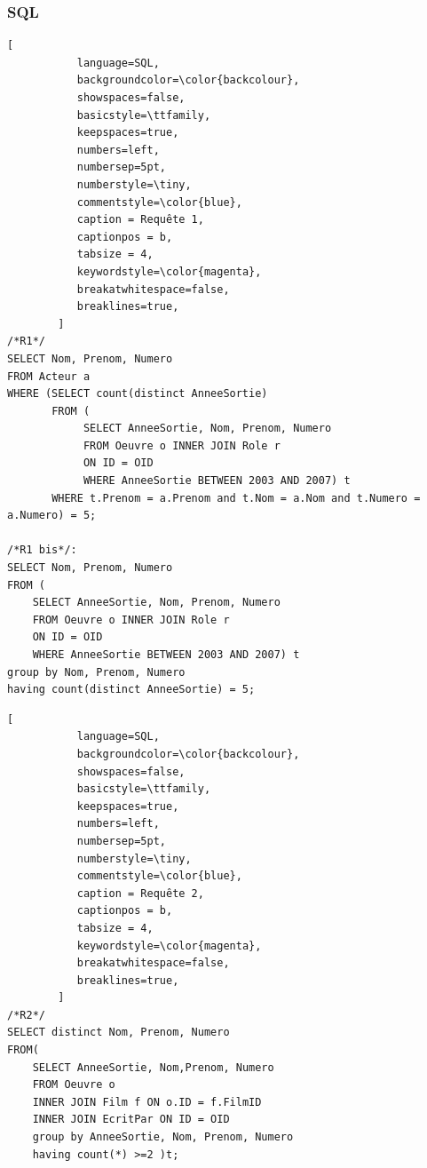 \documentclass[10pt,a4paper]{article}
\begin{document}
\subsubsection{SQL}
\begin{lstlisting}[
           language=SQL,
           backgroundcolor=\color{backcolour},
           showspaces=false,
           basicstyle=\ttfamily,
           keepspaces=true,                 
           numbers=left,                    
           numbersep=5pt,
           numberstyle=\tiny,
           commentstyle=\color{blue},
           caption = Requête 1,
           captionpos = b, 
           tabsize = 4,
           keywordstyle=\color{magenta},
           breakatwhitespace=false,         
           breaklines=true,
        ]
/*R1*/
SELECT Nom, Prenom, Numero
FROM Acteur a
WHERE (SELECT count(distinct AnneeSortie)
	   FROM (
			SELECT AnneeSortie, Nom, Prenom, Numero
			FROM Oeuvre o INNER JOIN Role r
			ON ID = OID
			WHERE AnneeSortie BETWEEN 2003 AND 2007) t
	   WHERE t.Prenom = a.Prenom and t.Nom = a.Nom and t.Numero = a.Numero) = 5;
       
/*R1 bis*/:
SELECT Nom, Prenom, Numero
FROM (
	SELECT AnneeSortie, Nom, Prenom, Numero
	FROM Oeuvre o INNER JOIN Role r
	ON ID = OID
	WHERE AnneeSortie BETWEEN 2003 AND 2007) t
group by Nom, Prenom, Numero
having count(distinct AnneeSortie) = 5;
\end{lstlisting}
\begin{lstlisting}[
           language=SQL,
           backgroundcolor=\color{backcolour},
           showspaces=false,
           basicstyle=\ttfamily,
           keepspaces=true,                 
           numbers=left,                    
           numbersep=5pt,
           numberstyle=\tiny,
           commentstyle=\color{blue},
           caption = Requête 2,
           captionpos = b,
           tabsize = 4,
           keywordstyle=\color{magenta},
           breakatwhitespace=false,         
           breaklines=true,
        ]
/*R2*/
SELECT distinct Nom, Prenom, Numero
FROM(
	SELECT AnneeSortie, Nom,Prenom, Numero
	FROM Oeuvre o
	INNER JOIN Film f ON o.ID = f.FilmID
	INNER JOIN EcritPar ON ID = OID
	group by AnneeSortie, Nom, Prenom, Numero
	having count(*) >=2 )t;
\end{lstlisting}
\end{document}
